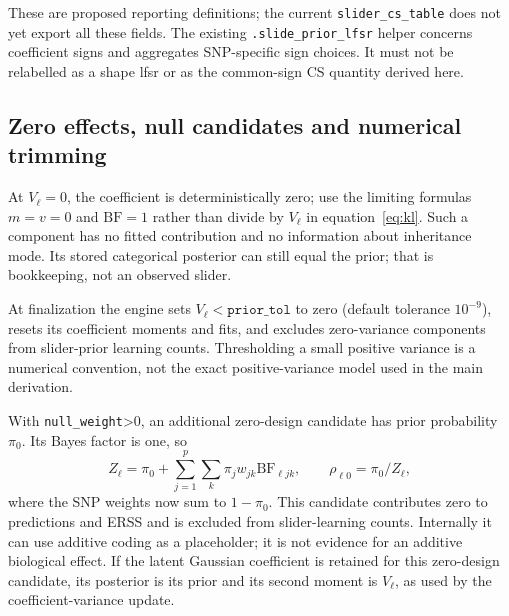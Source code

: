 \documentclass[11pt]{article}
\newcommand{\BF}{\mathrm{BF}}
\begin{document}
These are proposed reporting definitions; the current
\texttt{slider\_cs\_table} does not yet export all these fields.
The existing \texttt{.slide\_prior\_lfsr} helper concerns coefficient signs
and aggregates SNP-specific sign choices. It must not be relabelled as
a shape lfsr or as the common-sign CS quantity derived here.

\subsection{Zero effects, null candidates and numerical trimming}
\label{sec:zero}
At $V_\ell=0$, the coefficient is deterministically zero; use the limiting
formulas $m=v=0$ and $\BF=1$ rather than divide by $V_\ell$ in
equation~\eqref{eq:kl}. Such a component has no fitted contribution and
no information about inheritance mode. Its stored categorical posterior
can still equal the prior; that is bookkeeping, not an observed slider.

At finalization the engine sets $V_\ell<\texttt{prior\_tol}$ to zero
(default tolerance $10^{-9}$), resets its coefficient moments and fits,
and excludes zero-variance components from slider-prior learning counts.
Thresholding a small positive variance is a numerical convention, not
the exact positive-variance model used in the main derivation.

With \texttt{null\_weight}>0, an additional zero-design candidate has prior
probability $\pi_0$. Its Bayes factor is one, so
\begin{equation}
 Z_\ell=\pi_0+\sum_{j=1}^p\sum_k\pi_jw_{jk}\BF_{\ell jk},\qquad
 \rho_{\ell0}=\pi_0/Z_\ell,
 \label{eq:null}
\end{equation}
where the SNP weights now sum to $1-\pi_0$. This candidate contributes zero
to predictions and ERSS and is excluded from slider-learning counts.
Internally it can use additive coding as a placeholder; it is not evidence
for an additive biological effect. If the latent Gaussian coefficient is
retained for this zero-design candidate, its posterior is its prior and
its second moment is $V_\ell$, as used by the coefficient-variance update.
\end{document}
